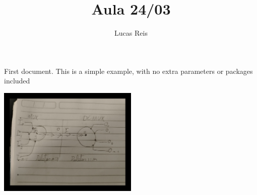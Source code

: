 \documentclass[12pt,a4paper]{letter}
\title{Aula 24/03}
\author{Lucas Reis}
\begin{document}
\maketitle

First document. This is a simple example, with no extra parameters or packages included

\includegraphics[width=0.5\textwidth]{imagem}
\end{document}
